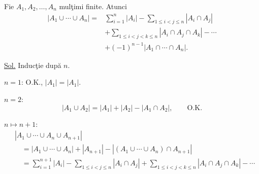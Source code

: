 \noindent Fie $A_1,A_2,\ldots,A_n$ mulţimi finite. Atunci
\[
\begin{aligned}
 \bigl|A_1\cup\cdots\cup A_n\bigr|
 ={}&\sum_{i=1}^{n}|A_i|
 -\sum_{1\leq i<j\leq n}|A_i\cap A_j|\\
 &+\sum_{1\leq i<j<k\leq n}|A_i\cap A_j\cap A_k|
 -\cdots\\
 &+(-1)^{n-1}|A_1\cap\cdots\cap A_n|.
\end{aligned}
\]

\noindent\underline{Sol.} Inducţie după $n$.

\noindent $n=1$: O.K., $|A_1|=|A_1|$.

\noindent $n=2$:
\[
 |A_1\cup A_2|=|A_1|+|A_2|-|A_1\cap A_2|,
 \qquad\text{O.K.}
\]

\noindent $n\longmapsto n+1$:
\[
\begin{aligned}
 &|A_1\cup\cdots\cup A_n\cup A_{n+1}|\\
 &\quad=|A_1\cup\cdots\cup A_n|+|A_{n+1}|
 -|(A_1\cup\cdots\cup A_n)\cap A_{n+1}|\\
 &\quad=\sum_{i=1}^{n+1}|A_i|
 -\sum_{1\leq i<j\leq n}|A_i\cap A_j|
 +\sum_{1\leq i<j<k\leq n}|A_i\cap A_j\cap A_k|
 -\cdots
\end{aligned}
\]
